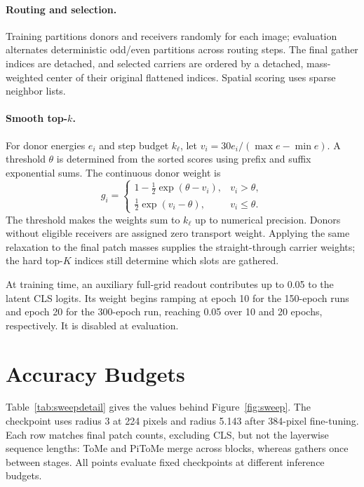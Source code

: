 \paragraph{Routing and selection.}
Training partitions donors and receivers randomly for each image;
evaluation alternates deterministic odd/even partitions across routing
steps. The final gather indices are detached, and selected carriers
are ordered by a detached, mass-weighted center of their original
flattened indices. Spatial scoring uses sparse neighbor lists.

\paragraph{Smooth top-$k$.}\label{app:soft-topk}
For donor energies $e_i$ and step budget $k_\ell$, let
$v_i=30e_i/(\max e-\min e)$. A threshold $\theta$ is determined from
the sorted scores using prefix and suffix exponential sums. The
continuous donor weight is
\begin{equation}
 g_i=\begin{cases}
  1-\tfrac12\exp(\theta-v_i), & v_i>\theta,\\
  \tfrac12\exp(v_i-\theta), & v_i\le\theta.
 \end{cases}
 \label{eq:soft-topk}
\end{equation}
The threshold makes the weights sum to $k_\ell$ up to numerical
precision. Donors without eligible receivers are assigned zero
transport weight. Applying the same relaxation to the final patch
masses supplies the straight-through carrier weights; the hard
top-$K$ indices still determine which slots are gathered.

At training time, an auxiliary full-grid readout contributes up to
0.05 to the latent CLS logits. Its weight begins ramping at epoch 10
for the 150-epoch runs and epoch 20 for the 300-epoch run, reaching
0.05 over 10 and 20 epochs, respectively. It is disabled at evaluation.

\section{Accuracy Budgets}
\label{app:latency}

Table~\ref{tab:sweepdetail} gives the values behind
Figure~\ref{fig:sweep}. The \mn{} checkpoint uses radius 3 at
224 pixels and radius 5.143 after 384-pixel fine-tuning. Each row
matches final patch counts, excluding CLS, but not the layerwise
sequence lengths: ToMe and PiToMe merge across blocks, whereas
\mn{} gathers once between stages. All points evaluate fixed
checkpoints at different inference budgets.

